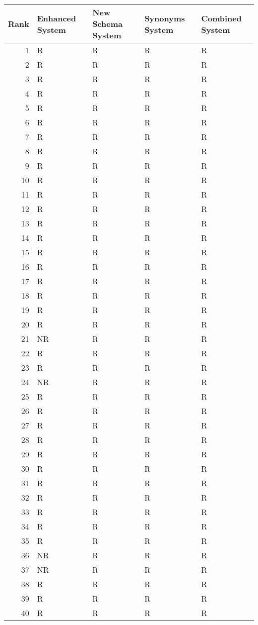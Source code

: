 \begin{tabular}{rllll}
\toprule
Rank & Enhanced System & New Schema System & Synonyms System & Combined System \\
\midrule
1 & R & R & R & R \\
2 & R & R & R & R \\
3 & R & R & R & R \\
4 & R & R & R & R \\
5 & R & R & R & R \\
6 & R & R & R & R \\
7 & R & R & R & R \\
8 & R & R & R & R \\
9 & R & R & R & R \\
10 & R & R & R & R \\
11 & R & R & R & R \\
12 & R & R & R & R \\
13 & R & R & R & R \\
14 & R & R & R & R \\
15 & R & R & R & R \\
16 & R & R & R & R \\
17 & R & R & R & R \\
18 & R & R & R & R \\
19 & R & R & R & R \\
20 & R & R & R & R \\
21 & NR & R & R & R \\
22 & R & R & R & R \\
23 & R & R & R & R \\
24 & NR & R & R & R \\
25 & R & R & R & R \\
26 & R & R & R & R \\
27 & R & R & R & R \\
28 & R & R & R & R \\
29 & R & R & R & R \\
30 & R & R & R & R \\
31 & R & R & R & R \\
32 & R & R & R & R \\
33 & R & R & R & R \\
34 & R & R & R & R \\
35 & R & R & R & R \\
36 & NR & R & R & R \\
37 & NR & R & R & R \\
38 & R & R & R & R \\
39 & R & R & R & R \\
40 & R & R & R & R \\
\bottomrule
\end{tabular}
